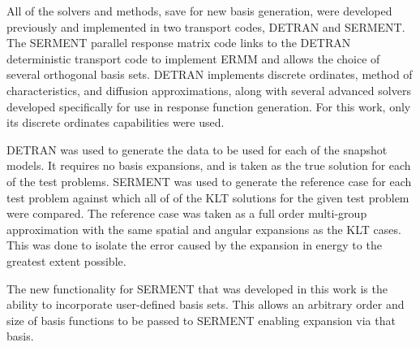 All of the solvers and methods, save for new basis generation, were developed 
previously and implemented in two transport codes, DETRAN and SERMENT.   The SERMENT parallel 
response matrix  code 
\citep{RobertsSerment} links to the DETRAN deterministic transport 
code \citep{RobertsDetran} to implement ERMM and allows the choice of several 
orthogonal basis sets.  DETRAN implements discrete ordinates, method of 
characteristics, and diffusion approximations, along with several advanced 
solvers developed specifically for use in response function generation. For 
this 
work, only its discrete ordinates capabilities were used.

DETRAN was used to generate the data to be used for each of the snapshot 
models.  It requires no basis expansions, 
and is taken as the true solution for each of the test problems.  SERMENT 
was used to generate the reference case for each test problem against which all of 
of the KLT solutions for the given test problem were compared.  The reference 
case was taken as a full order multi-group approximation with the same spatial 
and angular expansions as the KLT cases.  This was done to isolate the error 
caused by the expansion in energy to the greatest extent possible.  

The new functionality for SERMENT that was developed in this work is the 
ability to incorporate user-defined basis sets.  This allows an arbitrary order 
and size of basis functions to be passed to SERMENT enabling expansion 
via that basis.  